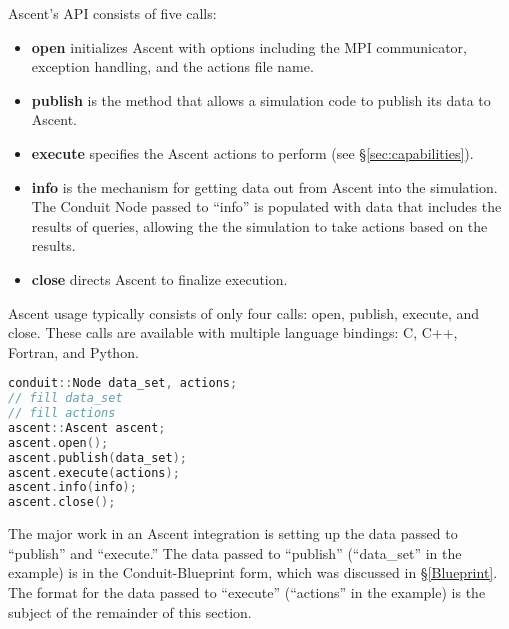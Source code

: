%

Ascent's API consists of five calls:
%
\begin{itemize}
  \item \textbf{open} initializes Ascent with options including the
MPI communicator, exception handling, and the actions file name.
%
  \item \textbf{publish} is the method that allows a simulation code to publish its data
to Ascent.  
%
   \item \textbf{execute} specifies the Ascent actions to perform (see \S\ref{sec:capabilities}).  
%
%
  \item \textbf{info} is the mechanism for getting data out from Ascent into the simulation.
%
The Conduit Node passed to ``info'' is populated with data that includes the results
of queries, allowing the the simulation to take actions based on the results.
%
  \item \textbf{close} directs Ascent to finalize execution.
\end{itemize}

Ascent usage typically consists of only four calls: open, publish, execute, and close.
%
These calls are available with multiple language bindings: C, C++, Fortran, and Python.
%
%
\begin{lstlisting}[language=C++,caption={Typical Ascent usage in C++}]
conduit::Node data_set, actions;
// fill data_set 
// fill actions 
ascent::Ascent ascent;
ascent.open();
ascent.publish(data_set);
ascent.execute(actions);
ascent.info(info);
ascent.close();
\end{lstlisting}

The major work in an Ascent integration is setting up the data passed to ``publish'' and
``execute.''
%
The data passed to ``publish'' (``data\_set'' in the example) is in the Conduit-Blueprint form, which was discussed in \S\ref{Blueprint}.
%
The format for the data passed to ``execute'' (``actions'' in the example) 
is the subject of the remainder of this section.
%


